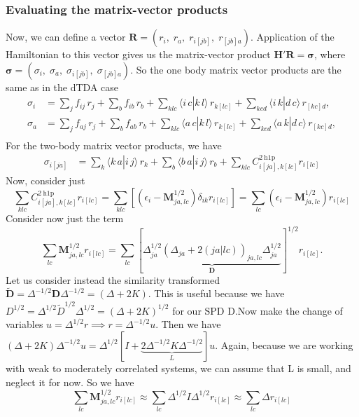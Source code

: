 \subsubsection{Evaluating the matrix-vector products}
Now, we can define a vector $\bm{R} = ( r_i,\; r_a,\; r_{i[jb]},\; r_{[jb]a} )$. Application of the Hamiltonian to this vector gives us the matrix-vector product $\bm{H'} \bm{R} = \bm{\sigma }$, where $\bm{\sigma} = ( \sigma_i,\; \sigma_a,\; \sigma_{i[jb]},\; \sigma_{[jb]a} )$. So the one body matrix vector products are the same as in the dTDA case
\begin{align}
\sigma_i &= 
  \sum_{j} f_{i j}\,r_j
  + \sum_{b} f_{i b}\,r_b
  + \sum_{k l c} \bigl\langle i\,c | k\,l \bigr\rangle\,r_{k[l c]}
  + \sum_{k c d} \bigl\langle i\,k | d\,c \bigr\rangle\,r_{[k c]d}, \\[6pt]
\sigma_a &=
    \sum_{j} f_{a j}\,r_j
    + \sum_{b} f_{a b}\,r_b
    + \sum_{k l c} \bigl\langle a\,c | k\,l \bigr\rangle\,r_{k[l c]}
    + \sum_{k c d} \bigl\langle a\,k | d\,c \bigr\rangle\,r_{[k c]d}, \\[6pt]
\end{align}
For the two-body matrix vector products, we have
\begin{align}
\sigma_{i[ja]} &=
    \sum_{k} \bigl\langle k\,a | i\,j \bigr\rangle\,r_k
    + \sum_{b} \bigl\langle b\,a | i\,j \bigr\rangle\,r_b
    + \sum_{klc} C_{i[j a], k[l c]}^{2 \mathrm{~h} 1 \mathrm{p}} r_{i[l c]}
\end{align}
Now, consider just
\begin{equation}
    \sum_{klc} C_{i[j a], k[l c]}^{2 \mathrm{~h} 1 \mathrm{p}} r_{i[l c]}= \sum_{klc} \left[\left(\epsilon_i-\bm{M}^{1/2}_{ja,lc}\right) \delta_{ik} r_{i[l c]} \right] = \sum_{l c} \left(\epsilon_i - \bm{M}^{1/2}_{ja,lc}\right) r_{i[l c]}
\end{equation}
Consider now just the term 
\begin{equation}
    \sum_{l c} \bm{M}^{1/2}_{ja,lc} r_{i[l c]} =  \sum_{l c} \left[\underbrace{\Delta _{ja}^{1/2} \left(\Delta_{ja} + 2(ja|lc)\right)_{ja,lc} \Delta_{ja}^{1/2}}_{\bm{D}}\right]^{1/2} r_{i[l c]}.
\end{equation}
Let us consider instead the similarity transformed $\tilde{\bm{D}} = \Delta^{-1/2} \bm{D} \Delta^{-1/2} = \left(\Delta + 2K\right)$. This is useful because we have $D^{1/2} = \Delta^{1/2}\tilde{D}^{1/2}\Delta^{1/2}=\left(\Delta+2K\right)^{1/2}$ for our SPD D.Now make the change of variables $u = \Delta^{1/2}r \implies r = \Delta^{-1/2}u$. Then we have $\left(\Delta + 2K\right) \Delta^{-1/2}u = \Delta^{1/2} \left[ {I} + \underbrace{2\Delta^{-1/2}K\Delta^{-1/2}}_{L}\right] u$. Again, because we are working with weak to moderately correlated systems, we can assume that L is small, and neglect it for now. So we have
\begin{equation}
    \sum_{l c} \bm{M}^{1/2}_{ja,lc} r_{i[l c]} \approx \sum_{l c} \Delta^{1/2} I \Delta^{1/2} r_{i[l c]} \approx \sum_{l c} \Delta r_{i[l c]}
\end{equation}

